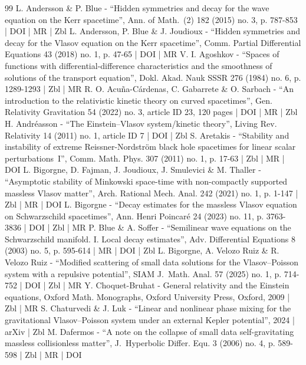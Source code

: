 \documentclass[10pt]{amsart}
\theoremstyle{plain}
\theoremstyle{definition}
\begin{document}
\begin{thebibliography}{99}
L. Andersson \& P. Blue - “Hidden symmetries and decay for the wave equation on the Kerr spacetime”, Ann. of Math. (2) 182 (2015) no. 3, p. 787-853 | DOI | MR | Zbl
L. Andersson, P. Blue \& J. Joudioux - “Hidden symmetries and decay for the Vlasov equation on the Kerr spacetime”, Comm. Partial Differential Equations 43 (2018) no. 1, p. 47-65 | DOI | MR
V. I. Agoshkov - “Spaces of functions with differential-difference characteristics and the smoothness of solutions of the transport equation”, Dokl. Akad. Nauk SSSR 276 (1984) no. 6, p. 1289-1293 | Zbl | MR
R. O. Acuña-Cárdenas, C. Gabarrete \& O. Sarbach - “An introduction to the relativistic kinetic theory on curved spacetimes”, Gen. Relativity Gravitation 54 (2022) no. 3, article ID 23, 120 pages | DOI | MR | Zbl
H. Andréasson - “The Einstein–Vlasov system/kinetic theory”, Living Rev. Relativity 14 (2011) no. 1, article ID 7 | DOI | Zbl
S. Aretakis - “Stability and instability of extreme Reissner-Nordström black hole spacetimes for linear scalar perturbations I”, Comm. Math. Phys. 307 (2011) no. 1, p. 17-63 | Zbl | MR | DOI
L. Bigorgne, D. Fajman, J. Joudioux, J. Smulevici \& M. Thaller - “Asymptotic stability of Minkowski space-time with non-compactly supported massless Vlasov matter”, Arch. Rational Mech. Anal. 242 (2021) no. 1, p. 1-147 | Zbl | MR | DOI
L. Bigorgne - “Decay estimates for the massless Vlasov equation on Schwarzschild spacetimes”, Ann. Henri Poincaré 24 (2023) no. 11, p. 3763-3836 | DOI | Zbl | MR
P. Blue \& A. Soffer - “Semilinear wave equations on the Schwarzschild manifold. I. Local decay estimates”, Adv. Differential Equations 8 (2003) no. 5, p. 595-614 | MR | DOI | Zbl
L. Bigorgne, A. Velozo Ruiz \& R. Velozo Ruiz - “Modified scattering of small data solutions for the Vlasov–Poisson system with a repulsive potential”, SIAM J. Math. Anal. 57 (2025) no. 1, p. 714-752 | DOI | Zbl | MR
Y. Choquet-Bruhat - General relativity and the Einstein equations, Oxford Math. Monographs, Oxford University Press, Oxford, 2009 | Zbl | MR
S. Chaturvedi \& J. Luk - “Linear and nonlinear phase mixing for the gravitational Vlasov–Poisson system under an external Kepler potential”, 2024 | arXiv | Zbl
M. Dafermos - “A note on the collapse of small data self-gravitating massless collisionless matter”, J. Hyperbolic Differ. Equ. 3 (2006) no. 4, p. 589-598 | Zbl | MR | DOI

\end{thebibliography}
\end{document}
